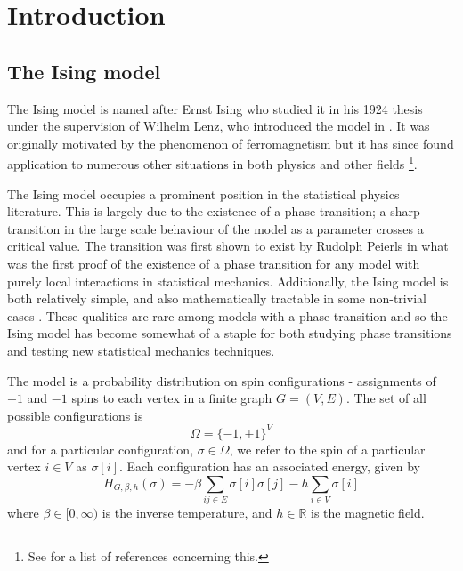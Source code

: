 \chapter{Introduction}
\label{Ch:CouplingIntro}



\section{The Ising model}
\label{sec:Ising}
	The Ising model is named after Ernst Ising who studied it in his 1924 thesis \cite{Ising1925-nd} under the supervision of Wilhelm Lenz, who introduced the model in \cite{Lenz1920-bn}. It was originally motivated by the phenomenon of ferromagnetism but it has since found application to numerous other situations in both physics and other fields \footnote{See \cite[notes of Section 1.4.2]{Friedli2017-xm} for a list of references concerning this.}.

	The Ising model occupies a prominent position in the statistical physics literature. This is largely due to the existence of a phase transition; a sharp transition in the large scale behaviour of the model as a parameter crosses a critical value. The transition was first shown to exist by Rudolph Peierls \cite{Peierls1936-pu} in what was the first proof of the existence of a phase transition for any model with purely local interactions in statistical mechanics.
	Additionally, the Ising model is both relatively simple, and also mathematically tractable in some non-trivial cases \cite{Onsager1944-li}. These qualities are rare among models with a phase transition and so the Ising model has become somewhat of a staple for both studying phase transitions and testing new statistical mechanics techniques.

	The model is a probability distribution on spin configurations - assignments of $+1$ and $-1$ spins to each vertex in a finite graph $G = (V, E)$. The set of all possible configurations is
	\begin{equation}
		\Omega = \{-1, +1\}^V
	\end{equation}
	and for a particular configuration, $\sigma \in \Omega$, we refer to the spin of a particular vertex $i \in V$ as $\sigma[i]$. Each configuration has an associated energy, given by 
	\begin{equation}
		H_{G, \beta, h}(\sigma) = -\beta \sum_{ij \in E} \sigma[i] \sigma[j] - h\sum_{i \in V} \sigma[i]
	\end{equation}
	where $\beta \in [0, \infty)$ is the inverse temperature, and $h \in \mathbb{R}$ is the magnetic field. 

